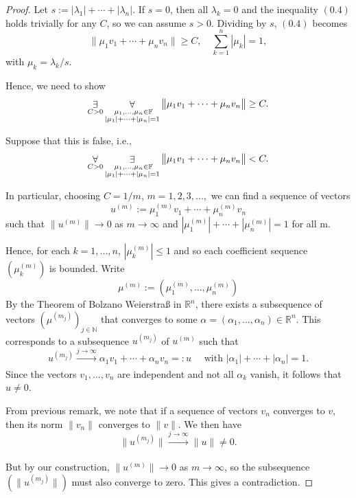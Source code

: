 \documentclass[10pt]{article}
\newcommand{\F}{\mathbb{F}}
\newcommand{\R}{\mathbb{R}}
\newcommand{\N}{\mathbb{N}}
\begin{document}
  \begin{proof}
    Let $s := |\lambda_{1}|+\cdots+|\lambda_{n}|$. If $s = 0$, then all $\lambda_{k} = 0$ and the inequality $(0.4)$ holds trivially
    for any $C$, so we can assume $s > 0$. Dividing by $s$, $(0.4)$ becomes 
    \begin{equation}
      \big\|\mu_{1}v_{1}+\cdots+\mu_{n}v_{n}\big\| \geq C, \quad \sum_{k = 1}^{n}|\mu_{k}| = 1,
    \end{equation}
    with $\mu_{k} = \lambda_{k}/s$.

    Hence, we need to show
    \[
      \mathop{\exists}_{C>0}\mathop{\forall}_{\begin{subarray}~~~~\mu_{1},...,\mu_{n} \in \F \\ |\mu_{1}|+\cdots+|\mu_{n}| = 1\end{subarray}} 
      \big\|\mu_{1}v_{1}+\cdots+\mu_{n}v_{n}\big\| \geq C.
    \]

    Suppose that this is false, i.e.,
    \[
      \mathop{\forall}_{C>0}\mathop{\exists}_{\begin{subarray}~~~~\mu_{1},...,\mu_{n} \in \F \\ |\mu_{1}|+\cdots+|\mu_{n}| = 1\end{subarray}}
      \big\|\mu_{1}v_{1}+\cdots+\mu_{n}v_{n}\big\| < C.  
    \]

    In particular, choosing $C = 1/m$, $m = 1,2,3,...,$ we can find a sequence of vectors
    \[
      u^{(m)} := \mu_{1}^{(m)}v_{1}+\cdots+\mu_{n}^{(m)}v_{n}
    \]
    such that $\|u^{(m)}\| \rightarrow 0$ as $m \rightarrow \infty$ and $|\mu_{1}^{(m)}|+\cdots+|\mu_{n}^{(m)}| = 1$ for all m.

    Hence, for each $k = 1,...,n$, $|\mu_{k}^{(m)}| \leq 1$ and so each coefficient sequence $\left(\mu_{k}^{(m)}\right)$ is bounded.
    Write
    \[\mu^{(m)}:=\left(\mu_{1}^{(m)},...,\mu_{n}^{(m)}\right)\]
    By the Theorem of Bolzano Weierstra{\ss} in $\R^{n}$, there exists a subsequence of vectors $\left(\mu^{(m_{j})}\right)_{j \in \N}$ that
    converges to some $\alpha = \left(\alpha_{1},...,\alpha_{n}\right) \in \R^{n}$. This corresponds to a subsequence $u^{(m_{j})}$ of $u^{(m)}$
    such that
    \[
      u^{(m_{j})} \xrightarrow[]{j \rightarrow \infty}\alpha_{1}v_{1}+\cdots+\alpha_{n}v_{n} =: u
      \quad \text{ with }|\alpha_{1}|+\cdots+|\alpha_{n}| = 1.
    \]
    Since the vectors $v_{1},...,v_{n}$ are independent and not all $\alpha_{k}$ vanish, it follows that $u \neq 0$.

    From previous remark, we note that if a sequence of vectors $v_{n}$ converges to $v$, then its norm $\|v_{n}\|$ converges to $\|v\|$.
    We then have
    \[
      \|u^{(m_{j})}\| \xrightarrow[]{j \rightarrow \infty} \|u\| \neq 0.
    \]

    But by our construction, $\big\|u^{(m)}\big\| \rightarrow 0$ as $m \rightarrow \infty$, so the subsequence 
    $\left(\big\|u^{(m_{j})}\big\|\right)$ must also converge to zero. This gives a contradiction.
  \end{proof}
\end{document}
